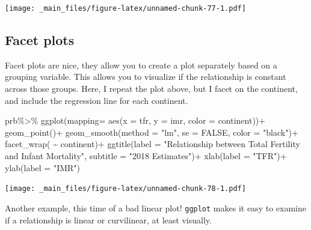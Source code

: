 \documentclass[
]{book}
\newenvironment{Shaded}{\begin{snugshade}}{\end{snugshade}}
\newcommand{\AttributeTok}[1]{\textcolor[rgb]{0.77,0.63,0.00}{#1}}
\newcommand{\ConstantTok}[1]{\textcolor[rgb]{0.00,0.00,0.00}{#1}}
\newcommand{\FunctionTok}[1]{\textcolor[rgb]{0.00,0.00,0.00}{#1}}
\newcommand{\NormalTok}[1]{#1}
\newcommand{\SpecialCharTok}[1]{\textcolor[rgb]{0.00,0.00,0.00}{#1}}
\newcommand{\StringTok}[1]{\textcolor[rgb]{0.31,0.60,0.02}{#1}}
\begin{document}
\texttt{[image: \_main\_files/figure-latex/unnamed-chunk-77-1.pdf]}

\hypertarget{facet-plots}{%
\subsection{Facet plots}\label{facet-plots}}

Facet plots are nice, they allow you to create a plot separately based
on a grouping variable. This allows you to visualize if the relationship
is constant across those groups. Here, I repeat the plot above, but I
facet on the continent, and include the regression line for each
continent.

\begin{Shaded}
\begin{Highlighting}[]
\NormalTok{prb}\SpecialCharTok{\%\textgreater{}\%}
\FunctionTok{ggplot}\NormalTok{(}\AttributeTok{mapping=} \FunctionTok{aes}\NormalTok{(}\AttributeTok{x =}\NormalTok{ tfr,}
                    \AttributeTok{y =}\NormalTok{ imr,}
                    \AttributeTok{color =}\NormalTok{ continent))}\SpecialCharTok{+}
  \FunctionTok{geom\_point}\NormalTok{()}\SpecialCharTok{+}
  \FunctionTok{geom\_smooth}\NormalTok{(}\AttributeTok{method =} \StringTok{"lm"}\NormalTok{,}
              \AttributeTok{se =} \ConstantTok{FALSE}\NormalTok{,}
              \AttributeTok{color =} \StringTok{"black"}\NormalTok{)}\SpecialCharTok{+}
  \FunctionTok{facet\_wrap}\NormalTok{( }\SpecialCharTok{\textasciitilde{}}\NormalTok{ continent)}\SpecialCharTok{+}
  \FunctionTok{ggtitle}\NormalTok{(}\AttributeTok{label =} \StringTok{"Relationship between Total Fertility and Infant Mortality"}\NormalTok{,}
          \AttributeTok{subtitle =} \StringTok{"2018 Estimates"}\NormalTok{)}\SpecialCharTok{+}
  \FunctionTok{xlab}\NormalTok{(}\AttributeTok{label =} \StringTok{"TFR"}\NormalTok{)}\SpecialCharTok{+}
  \FunctionTok{ylab}\NormalTok{(}\AttributeTok{label =} \StringTok{"IMR"}\NormalTok{)}
\end{Highlighting}
\end{Shaded}

\texttt{[image: \_main\_files/figure-latex/unnamed-chunk-78-1.pdf]}

Another example, this time of a bad linear plot! \texttt{ggplot} makes it easy
to examine if a relationship is linear or curvilinear, at least
visually.
\end{document}
